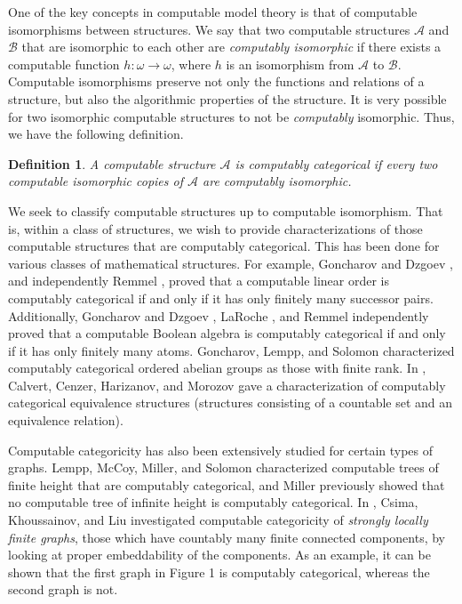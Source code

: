 \documentclass[12pt]{article}
\newtheorem{dfn}[thm]{Definition}
\begin{document}
One of the key concepts in computable model theory is that of computable isomorphisms between structures. We say that two computable structures $\mathcal{A}$ and $\mathcal{B}$ that are isomorphic to each other are \emph{computably isomorphic} if there exists a computable function $h: \omega \to \omega$, where $h$ is an isomorphism from $\mathcal{A}$ to $\mathcal{B}$. Computable isomorphisms preserve not only the functions and relations of a structure, but also the algorithmic properties of the structure. It is very possible for two isomorphic computable structures to not be \emph{computably} isomorphic. Thus, we have the following definition.\\

\begin{dfn}
A computable structure $\mathcal{A}$ is \emph{computably categorical} if every two computable isomorphic copies of $\mathcal{A}$ are computably isomorphic.
\end{dfn}

We seek to classify computable structures up to computable isomorphism. That is, within a class of structures, we wish to provide characterizations of those computable structures that are computably categorical. This has been done for various classes of mathematical structures. For example, Goncharov and Dzgoev \cite{Autostability}, and independently Remmel \cite{linearOrders}, proved that a computable linear order is computably categorical if and only if it has only finitely many successor pairs. Additionally, Goncharov and Dzgoev \cite{Autostability}, LaRoche \cite{booleanAlgebras1}, and Remmel \cite{booleanAlgebras2} independently proved that a computable Boolean algebra is computably categorical if and only if it has only finitely many atoms. Goncharov, Lempp, and Solomon \cite{abelianGroups} characterized computably categorical ordered abelian groups as those with finite rank. In \cite{equivalenceStructures}, Calvert, Cenzer, Harizanov, and Morozov gave a characterization of computably categorical equivalence structures (structures consisting of a countable set and an equivalence relation).

Computable categoricity has also been extensively studied for certain types of graphs. Lempp, McCoy, Miller, and Solomon \cite{treesFiniteHeight} characterized computable trees of finite height that are computably categorical, and Miller \cite{treesInfiniteHeight} previously showed that no computable tree of infinite height is computably categorical. In \cite{SLFG}, Csima, Khoussainov, and Liu investigated computable categoricity of \emph{strongly locally finite graphs}, those which have countably many finite connected components, by looking at proper embeddability of the components. As an example, it can be shown that the first graph in Figure 1 is computably categorical, whereas the second graph is not.
\end{document}
